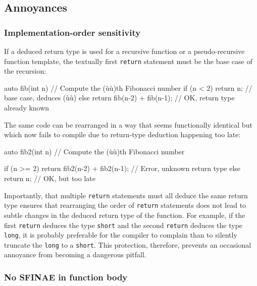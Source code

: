 \subsection[Annoyances]{Annoyances}\label{annoyances}

\subsubsection[Implementation-order sensitivity]{Implementation-order sensitivity}\label{implementation-order-sensitivity}

If a deduced return type is used for a recursive function or a
pseudo-recursive function template, the textually first \lstinline!return!
statement must be the base case of the recursion:

\begin{emcppslisting}
auto fib(int n)
    // Compute the (ù{}ù)th Fibonacci number
{
    if (n < 2) { return n; }              // base case, deduces (ù{}ù)
    else { return fib(n-2) + fib(n-1); }  // OK, return type already known
}
\end{emcppslisting}
    

\noindent The same code can be rearranged in a way that seems functionally
identical but which now fails to compile due to return-type deduction
happening too late:

\begin{emcppslisting}
auto fib2(int n)
    // Compute the (ù{}ù)th Fibonacci number
{

    if (n >= 2) { return fib2(n-2) + fib2(n-1); }  // Error, unknown return type
    else        { return n; }                      // OK, but too late
}
\end{emcppslisting}
    

\noindent Importantly, that multiple \lstinline!return! statements must all deduce
the same return type ensures that rearranging the order of
\lstinline!return! statements does not lead to subtle changes in the
deduced return type of the function. For example, if the first
\lstinline!return! deduces the type \lstinline!short! and the second
\lstinline!return! deduces the type \lstinline!long!, it is probably
preferable for the compiler to complain than to silently truncate the
\lstinline!long! to a \lstinline!short!. This protection, therefore, prevents
an occasional annoyance from becoming a dangerous pitfall.

\subsubsection[No SFINAE in function body]{No SFINAE in function body}\label{no-sfinae-in-function-body}

